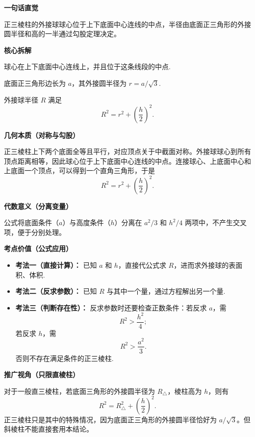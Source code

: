 \begin{explanationbox}
	\textbf{\textcolor{CExplanation}{一句话直觉}}

	正三棱柱的外接球球心位于上下底面中心连线的中点，半径由底面正三角形的外接圆半径和高的一半通过勾股定理决定。

	\medskip
	\textbf{\textcolor{CExplanation}{核心拆解}}
	\begin{description}[style=nextline, leftmargin=2.8em, labelsep=0.5em, itemsep=0.45em]
		\item[\textbf{要点一（球心位置）：}] 球心在上下底面中心连线上，并且位于这条线段的中点.
		\item[\textbf{要点二（底面半径）：}] 底面正三角形边长为 $a$，其外接圆半径为 $r=a/\sqrt{3}$.
		\item[\textbf{要点三（半径构成）：}] 外接球半径 $R$ 满足
		      \[
			      R^{2}=r^{2}+\left(\frac h2\right)^{2}.
		      \]
	\end{description}

	\medskip
	\textbf{\textcolor{CExplanation}{几何本质（对称与勾股）}}

	正三棱柱上下两个底面全等且平行，对应顶点关于中截面对称。外接球球心到所有顶点距离相等，因此球心位于上下底面中心连线的中点。连接球心、上底面中心和上底面一个顶点，可以得到一个直角三角形，于是
	\[
		R^{2}=r^{2}+\left(\frac h2\right)^{2}.
	\]

	\medskip
	\textbf{\textcolor{CExplanation}{代数意义（分离变量）}}

	公式将底面条件（$a$）与高度条件（$h$）分离在 $a^{2}/3$ 和 $h^{2}/4$ 两项中，不产生交叉项，便于分别处理。

	\medskip
	\textbf{\textcolor{CExplanation}{考点价值（公式应用）}}
	\begin{itemize}[leftmargin=*, itemsep=0.5em, topsep=0.4em]
		\item \textbf{考法一（直接计算）：} 已知 $a$ 和 $h$，直接代公式求 $R$，进而求外接球的表面积、体积.
		\item \textbf{考法二（反求参数）：} 已知 $R$ 与其中一个量，通过方程解出另一个量.
		\item \textbf{考法三（判断存在性）：} 反求参数时还要检查正数条件：若反求 $a$，需
		      \[
			      R^{2}>\frac{h^{2}}{4};
		      \]
		      若反求 $h$，需
		      \[
			      R^{2}>\frac{a^{2}}{3}.
		      \]
		      否则不存在满足条件的正三棱柱.
	\end{itemize}

	\medskip
	\textbf{\textcolor{CExplanation}{推广视角（只限直棱柱）}}

	对于一般直三棱柱，若底面三角形的外接圆半径为 $R_{\triangle}$，棱柱高为 $h$，则有
	\[
		R^{2}=R_{\triangle}^{2}+\left(\frac h2\right)^{2}.
	\]
	正三棱柱只是其中的特殊情况，因为底面正三角形的外接圆半径恰好为 $a/\sqrt3$。但斜棱柱不能直接套用本结论。


\end{explanationbox}
